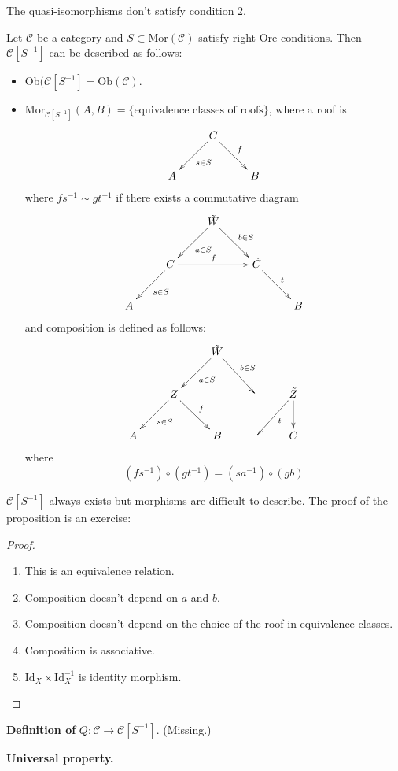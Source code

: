 The quasi-isomorphisms don't satisfy condition 2.

\begin{proposition}
\label{proposition-caracterization-of-derived-category}
Let $\mathcal{C}$ be a category and $S\subset \text{Mor}(\mathcal{C})$ satisfy
right Ore conditions. Then $\mathcal{C}[S^{-1}]$ can be described as follows:
\begin{itemize}
\item $\text{Ob}(\mathcal{C}[S^{-1}]=\text{Ob}(\mathcal{C})$.
\item $\text{Mor}_{\mathcal{C}[S^{-1}]}(A,B)=\{\text{equivalence classes of
roofs}\}$, where a roof is
$$
\xymatrix{
& C\ar[dl]^{s\in S}\ar[dr]^{f}\\
A&&B
}
$$
where $fs^{-1}\sim gt^{-1}$ if there exists a commutative diagram
$$
\xymatrix{
& & \tilde{W} \ar[ld]^{a \in S} \ar[dr]^{b \in S} & & \\
& C \ar[ld]^{s \in S} \ar[rr]^{f} & & \tilde{C} \ar[rd]^{t} & \\
A & & & & B
}
$$
and composition is defined as follows:
$$
\xymatrix{
& & \tilde{W}\ar[ld]^{a \in S}\ar[dr]^{b \in S}\\
&Z\ar[ld]^{s \in S}\ar[dr]^{f} & & & \tilde{Z}\ar[d]\ar[dl]^{t}\\
A & &B & & C
}
$$
where
$$
(fs^{-1})\circ (gt^{-1})=(sa^{-1})\circ(gb)
$$
\end{itemize}
\end{proposition}

$\mathcal{C}[S^{-1}]$ always exists but morphisms are difficult to describe. The
proof of the proposition is an exercise:

\begin{proof}
\begin{enumerate}
\item This is an equivalence relation.
\item Composition doesn't depend on $a$ and $b$.
\item Composition doesn't depend on the choice of the roof in equivalence
classes.
\item Composition is associative.
\item $\text{Id}_X \times \text{Id}_X^{-1}$ is identity morphism.
\end{enumerate}
\end{proof}

{\bf Definition of} $Q:\mathcal{C} \to \mathcal{C}[S^{-1}]$. (Missing.)

{\bf Universal property.}

